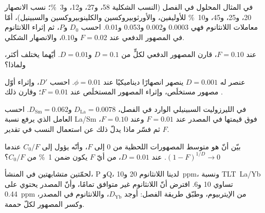 \begin{exercise}[$\star\star$]\label{exo:b3:trace-element-modelling:6}
في المثال المحلول في الفصل (النسب الشكلية 58، و27، و12، و\qty{3}{\percent}؛
نسب الانصهار 20، و25، و45، و\qty{10}{\percent} للأوليفين،
والأورثوبيروكسين والكلينوبيروكسين والسبينيل)، أمّا معاملات اللانثانوم فهي
0.0003 و0.002 و0.053 و0.01. احسب $D_0$ و$P$، ثم إثراء اللانثانوم في المصهور الدفعي
عند $F = 0.02$ و$0.10$،  والانصهار الشكلي.
\end{exercise}

\begin{exercise}[$\star\star$]\label{exo:b3:trace-element-modelling:7}
عند $F = 0.10$، قارن المصهور الدفعي  لكلٍّ من
$D = 0.1$ و$D = 0.01$. أيّهما يختلف أكثر، ولماذا؟
\end{exercise}

\begin{exercise}[$\star\star$]\label{exo:b3:trace-element-modelling:8}
عنصر له $D = 0.001$ ينصهر انصهارًا ديناميكيًا عند $\phi = 0.01$. احسب
$D'$، وإثراء أوّل مصهور مستخلَص، وإثراء المصهور المستخلَص
عند $F = 0.01$؛ وقارن ذلك .
\end{exercise}

\begin{exercise}[$\star\star$]\label{exo:b3:trace-element-modelling:9}
في الليرزوليت السبينيلي الوارد في الفصل، $D_{\mathrm{La}} = 0.0078$
و$D_{\mathrm{Sm}} = 0.062$. احسب العامل الذي يرفع  نسبة La/Sm فوق
قيمتها في المصدر عند $F = 0.01$ وعند $F = 0.10$، ثم فسّر ماذا يدلّ ذلك
عن استعمال النسب في تقدير $F$.
\end{exercise}

\begin{exercise}[$\star\star\star$]\label{exo:b3:trace-element-modelling:10}
بيّن أنّ  هو متوسط المصهورات اللحظية
من 0 إلى $F$، وأنّه يؤول إلى $C_0/F$ عندما $(1 - F)^{1/D} \to 0$.
عند $D = 0.01$، من أيّ $F$ يكون ضمن \qty{1}{\percent} من $C_0/F$؟
\end{exercise}

\begin{exercise}[$\star\star\star$]\label{exo:b3:trace-element-modelling:11}
لحمّتين متشابهتين في المنشأ، P وQ، لدينا اللانثانوم 20 و\qty{10}{ppm}، ونسبة \mbox{\textdir TLT La/Yb} تساوي 10 و6.
افترض أنّ اللانثانوم غير متوافق تمامًا، وأنّ المصدر يحتوي على
\qty{0.44}{ppm} من الإيتربيوم، وطبّق طريقة الفصل: أوجد $D_{\mathrm{Yb}}$،
واللانثانوم في المصدر، وكسر المصهور لكلّ حممة.
\end{exercise}

